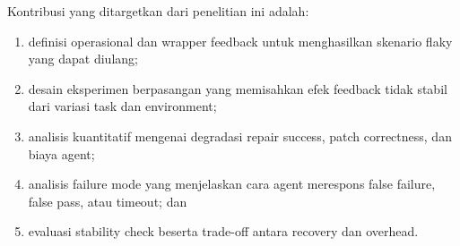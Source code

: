 Kontribusi yang ditargetkan dari penelitian ini adalah:

\begin{enumerate}[leftmargin=*]
    \item definisi operasional dan wrapper feedback untuk menghasilkan skenario flaky yang dapat diulang;
    \item desain eksperimen berpasangan yang memisahkan efek feedback tidak stabil dari variasi task dan environment;
    \item analisis kuantitatif mengenai degradasi repair success, patch correctness, dan biaya agent;
    \item analisis failure mode yang menjelaskan cara agent merespons false failure, false pass, atau timeout; dan
    \item evaluasi stability check beserta trade-off antara recovery dan overhead.
\end{enumerate}
